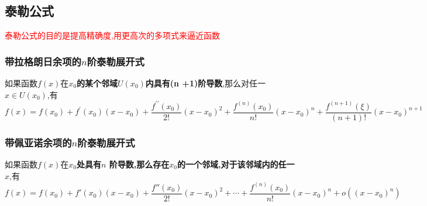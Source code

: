 \documentclass[8pt a4paper, oneside, UTF8]{ctexbook}
\begin{document}
\begin{sloppypar}
    \subsection{泰勒公式}
    \textcolor{red}{泰勒公式的目的是提高精确度,用更高次的多项式来逼近函数}
    \subsubsection{带拉格朗日余项的$n$阶泰勒展开式}
    如果函数$f(x)$在\textbf{$x_0$的某个邻域$U(x_0)$内具有(n +1)阶导数},那么对任一$x\in U(x_0)$,有
    $$
    f(x)=f(x_{0})+f^{\prime}(x_{0})(x-x_{0})+\dfrac{f^{\prime\prime}(x_{0})}{2!}(x-x_{0})^{2}+\dfrac{f^{(n)}\left(x_{0}\right)}{n!}\left(x-x_{0}\right)^{n}+{\dfrac{f^{(n+1)}(\xi)}{(n+1)!}}(x-x_{0})^{n+1}
    $$
    \subsubsection{带佩亚诺余项的$n$阶泰勒展开式}
    如果函数$f(x)$在\textbf{$x_0$处具有$n$ 阶导数,那么存在$x_{0}$的一个邻域,对于该邻域内的任一 $x$},有
    $$
    f(x)=f(x_{0})+f'(x_{0})(x-x_{0})+\dfrac{f''(x_{0})}{2!}(x-x_{0})^{2}+\cdots+\dfrac{f^{(n)}(x_{0})}{n!}(x-x_{0})^{n}+o\left(\left(x-x_{0}\right)^{n}\right)
    $$

\end{sloppypar}
\end{document}
